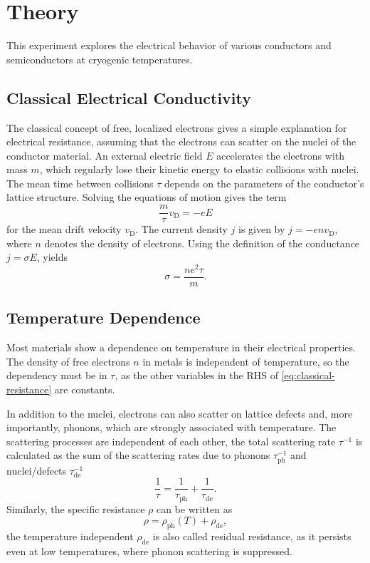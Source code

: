 \chapter{Theory}
This experiment explores the electrical behavior of various conductors and semiconductors at cryogenic temperatures.

\section{Classical Electrical Conductivity}
The classical concept of free, localized electrons gives a simple explanation for electrical resistance, assuming that the electrons can scatter on the nuclei of the conductor material.
An external electric field $E$ accelerates the electrons with mass $m$, which regularly lose their kinetic energy to elastic collisions with nuclei.
The mean time between collisions $\tau$ depends on the parameters of the conductor's lattice structure.
Solving the equations of motion gives the term
\begin{equation*}
	\frac{m}{\tau} v_\text{D} = - e E
\end{equation*}
for the mean drift velocity $v_\text{D}$. The current density $j$ is given by $j = - e n v_\text{D}$, where $n$ denotes the density of electrons.
Using the definition of the conductance $j = \sigma E$, yields
\begin{equation}\label{eq:classical-resistance}
	\sigma = \frac{n e^2 \tau}{m}.
\end{equation}

\section{Temperature Dependence}
Most materials show a dependence on temperature in their electrical properties.
The density of free electrons $n$ in metals is independent of temperature, so the dependency must be in $\tau$, as the other variables in the RHS of \autoref{eq:classical-resistance} are constants.

In addition to the nuclei, electrons can also scatter on lattice defects and, more importantly, phonons, which are strongly associated with temperature.
The scattering processes are independent of each other, the total scattering rate $\tau^{-1}$ is calculated as the sum of the scattering rates due to phonons $\tau_\text{ph}^{-1}$ and nuclei/defects $\tau_\text{de}^{-1}$
\begin{equation*}
	\frac{1}{\tau} = \frac{1}{\tau_\text{ph}} + \frac{1}{\tau_\text{de}}.
\end{equation*}
Similarly, the specific resistance $\rho$ can be written as
\begin{equation*}
	\rho = \rho_\text{ph}(T) + \rho_\text{de},
\end{equation*}
the temperature independent $\rho_\text{de}$ is also called residual resistance, as it persists even at low temperatures, where phonon scattering is suppressed.

